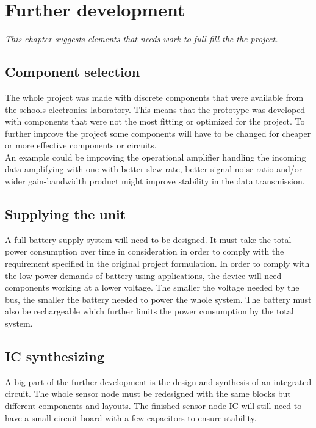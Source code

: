 \chapter{Further development}
\textit{This chapter suggests elements that needs work to full fill the the project.}

\section{Component selection}
The whole project was made with discrete components that were available from the schools electronics laboratory. This means that the prototype was developed with components that were not the most fitting or optimized for the project. To further improve the project some components will have to be changed for cheaper or more effective components or circuits. \\
An example could be improving the operational amplifier handling the incoming data amplifying with one with better slew rate, better signal-noise ratio and/or wider gain-bandwidth product might improve stability in the data transmission.

\section{Supplying the unit}
A full battery supply system will need to be designed. It must take the total power consumption over time in consideration in order to comply with the requirement specified in the original project formulation. In order to comply with the low power demands of battery using applications, the device will need components working at a lower voltage. The smaller the voltage needed by the bus, the smaller the battery needed to power the whole system. The battery must also be rechargeable which further limits the power consumption by the total system.

\section{IC synthesizing}
A big part of the further development is the design and synthesis of an integrated circuit. The whole sensor node must be redesigned with the same blocks but different components and layouts. The finished sensor node IC will still need to have a small circuit board with a few capacitors to ensure stability.

